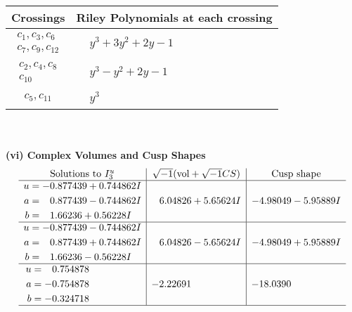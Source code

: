 \documentclass[1p]{elsarticle_modified}
\theoremstyle{definition}
\newcommand{\I}{\sqrt{-1}}
\begin{document}
\begin{tabular}{m{50pt}|m{274pt}}
Crossings & \hspace{64pt}Riley Polynomials at each crossing \\
\hline $$\begin{aligned}c_{1},c_{3},c_{6}\\c_{7},c_{9},c_{12}\end{aligned}$$&$\begin{aligned}
&y^3+3 y^2+2 y-1
\end{aligned}$\\
\hline $$\begin{aligned}c_{2},c_{4},c_{8}\\c_{10}\end{aligned}$$&$\begin{aligned}
&y^3- y^2+2 y-1
\end{aligned}$\\
\hline $$\begin{aligned}c_{5},c_{11}\end{aligned}$$&$\begin{aligned}
&y^3
\end{aligned}$\\
\hline
\end{tabular}\\~\\
\newpage\flushleft \textbf{(vi) Complex Volumes and Cusp Shapes}
$$\begin{array}{c|c|c}  
\text{Solutions to }I^u_{3}& \I (\text{vol} + \sqrt{-1}CS) & \text{Cusp shape}\\
 \hline 
\begin{aligned}
u &= -0.877439 + 0.744862 I \\
a &= \phantom{-}0.877439 - 0.744862 I \\
b &= \phantom{-}1.66236 + 0.56228 I\end{aligned}
 & \phantom{-}6.04826 + 5.65624 I & -4.98049 - 5.95889 I \\ \hline\begin{aligned}
u &= -0.877439 - 0.744862 I \\
a &= \phantom{-}0.877439 + 0.744862 I \\
b &= \phantom{-}1.66236 - 0.56228 I\end{aligned}
 & \phantom{-}6.04826 - 5.65624 I & -4.98049 + 5.95889 I \\ \hline\begin{aligned}
u &= \phantom{-}0.754878\phantom{ +0.000000I} \\
a &= -0.754878\phantom{ +0.000000I} \\
b &= -0.324718\phantom{ +0.000000I}\end{aligned}
 & -2.22691\phantom{ +0.000000I} & -18.0390\phantom{ +0.000000I}\\
 \hline 
 \end{array}$$\newpage\newpage\renewcommand{\arraystretch}{1}
\end{document}
